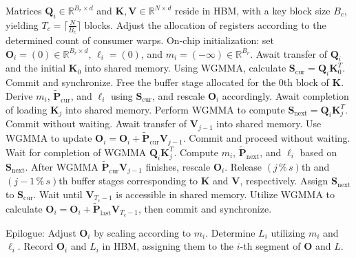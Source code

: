 \begin{algorithm}[H]
    \caption{\small\label{alg:flash3_wgmma}\textsc{FlashAttention-3} consumer warpgroup forward pass}
    \begin{algorithmic}[1]
      \REQUIRE  Matrices $\mathbf{Q}_i \in \mathbb{R}^{B_r \times d}$ and $\mathbf{K}, \mathbf{V} \in \mathbb{R}^{N \times d}$ reside in HBM, with a key block size $B_c$, yielding $T_c = \lceil \frac{N}{B_c} \rceil$ blocks.
      \STATE Adjust the allocation of registers according to the determined count of consumer warps.
      \STATE On-chip initialization: set $\mathbf{O}_i = (0) \in \mathbb{R}^{B_r \times d}$, $\ell_i = (0)$, and $m_i = (-\infty) \in \mathbb{R}^{B_r}$.
      \STATE Await transfer of $\mathbf{Q}_i$ and the initial $\mathbf{K}_0$ into shared memory.
      \STATE Using WGMMA, calculate $\mathbf{S}_{\mathrm{cur}} = \mathbf{Q}_i \mathbf{K}_0^T$. Commit and synchronize.
      \STATE Free the buffer stage allocated for the $0$th block of $\mathbf{K}$.
      \STATE Derive $m_{i}$, $\tilde{\mathbf{P}}_{\mathrm{cur}}$, and $\ell_{i}$ using $\mathbf{S}_{\mathrm{cur}}$, and rescale $\mathbf{O}_i$ accordingly.
        \STATE Await completion of loading $\mathbf{K}_j$ into shared memory.
        \label{code:mainloop_start}
        \STATE Perform WGMMA to compute $\mathbf{S}_{\mathrm{next}} = \mathbf{Q}_i \mathbf{K}_{j}^T$. Commit without waiting. \label{code:first_wgmma}
        \STATE Await transfer of $\mathbf{V}_{j-1}$ into shared memory.
        \STATE Use WGMMA to update $\mathbf{O}_{i} = \mathbf{O}_{i} + \tilde{\mathbf{P}}_{\mathrm{cur}} \mathbf{V}_{j-1}$. Commit and proceed without waiting. \label{code:second_wgmma}
        \STATE Wait for completion of WGMMA $\mathbf{Q}_i \mathbf{K}_{j}^T$.
        \STATE Compute $m_{i}$, $\tilde{\mathbf{P}}_{\mathrm{next}}$, and $\ell_{i}$ based on $\mathbf{S}_{\mathrm{next}}$. \label{code:softmax}
        \STATE After WGMMA $\tilde{\mathbf{P}}_{\mathrm{cur}} \mathbf{V}_{j-1}$ finishes, rescale $\mathbf{O}_i$.
        \STATE Release $(j\,\%\,s)$th and $(j-1\,\%\,s)$th buffer stages corresponding to $\mathbf{K}$ and $\mathbf{V}$, respectively.
        \STATE Assign $\mathbf{S}_{\mathrm{next}}$ to $\mathbf{S}_{\mathrm{cur}}$.
        \label{code:mainloop_end}
      \ENDFOR
      \STATE Wait until $\mathbf{V}_{T_c - 1}$ is accessible in shared memory.
      \STATE Utilize WGMMA to calculate
      $\mathbf{O}_{i} = \mathbf{O}_{i} + \tilde{\mathbf{P}}_{\mathrm{last}} \mathbf{V}_{T_c - 1}$, then commit and synchronize.

\STATE Epilogue: Adjust $\mathbf{O}_{i}$ by scaling according to $m_{i}$. Determine $L_{i}$ utilizing $m_{i}$ and $\ell_{i}$.
Record $\mathbf{O}_{i}$ and $L_{i}$ in HBM, assigning them to the $i$-th segment of $\mathbf{O}$ and $L$.
\end{algorithmic}
\end{algorithm}


